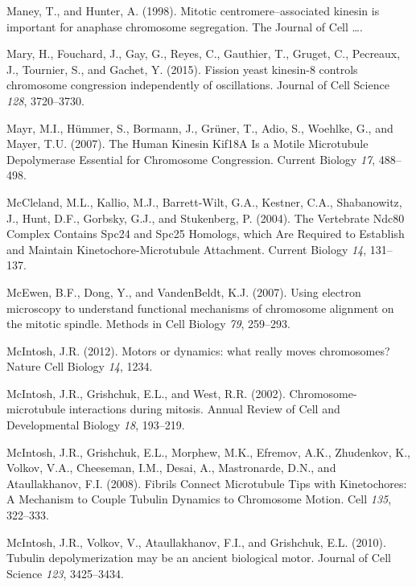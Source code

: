 \documentclass[12pt,a4paper,twoside,openright]{book}
\begin{document}
Maney, T., and Hunter, A. (1998). Mitotic centromere--associated kinesin
is important for anaphase chromosome segregation. The Journal of Cell
\ldots{}.

Mary, H., Fouchard, J., Gay, G., Reyes, C., Gauthier, T., Gruget, C.,
Pecreaux, J., Tournier, S., and Gachet, Y. (2015). Fission yeast
kinesin-8 controls chromosome congression independently of oscillations.
Journal of Cell Science \emph{128}, 3720--3730.

Mayr, M.I., Hümmer, S., Bormann, J., Grüner, T., Adio, S., Woehlke, G.,
and Mayer, T.U. (2007). The Human Kinesin Kif18A Is a Motile Microtubule
Depolymerase Essential for Chromosome Congression. Current Biology
\emph{17}, 488--498.

McCleland, M.L., Kallio, M.J., Barrett-Wilt, G.A., Kestner, C.A.,
Shabanowitz, J., Hunt, D.F., Gorbsky, G.J., and Stukenberg, P. (2004).
The Vertebrate Ndc80 Complex Contains Spc24 and Spc25 Homologs, which
Are Required to Establish and Maintain Kinetochore-Microtubule
Attachment. Current Biology \emph{14}, 131--137.

McEwen, B.F., Dong, Y., and VandenBeldt, K.J. (2007). Using electron
microscopy to understand functional mechanisms of chromosome alignment
on the mitotic spindle. Methods in Cell Biology \emph{79}, 259--293.

McIntosh, J.R. (2012). Motors or dynamics: what really moves
chromosomes? Nature Cell Biology \emph{14}, 1234.

McIntosh, J.R., Grishchuk, E.L., and West, R.R. (2002).
Chromosome-microtubule interactions during mitosis. Annual Review of
Cell and Developmental Biology \emph{18}, 193--219.

McIntosh, J.R., Grishchuk, E.L., Morphew, M.K., Efremov, A.K.,
Zhudenkov, K., Volkov, V.A., Cheeseman, I.M., Desai, A., Mastronarde,
D.N., and Ataullakhanov, F.I. (2008). Fibrils Connect Microtubule Tips
with Kinetochores: A Mechanism to Couple Tubulin Dynamics to Chromosome
Motion. Cell \emph{135}, 322--333.

McIntosh, J.R., Volkov, V., Ataullakhanov, F.I., and Grishchuk, E.L.
(2010). Tubulin depolymerization may be an ancient biological motor.
Journal of Cell Science \emph{123}, 3425--3434.
\end{document}
